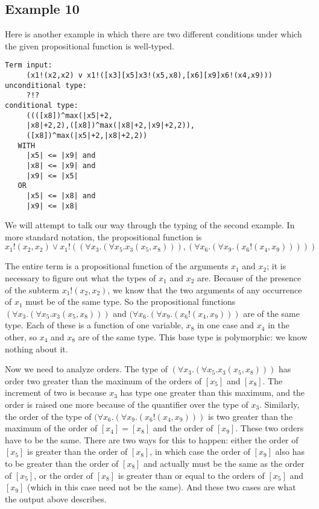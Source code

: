 \documentclass{article}
\begin{document}
\subsection{Example 10}
Here is another example in which there are two different conditions under which
the given propositional function is well-typed.


\begin{verbatim}
Term input:
     (x1!(x2,x2) v x1!([x3][x5]x3!(x5,x8),[x6][x9]x6!(x4,x9)))
unconditional type:
     ?!? 
conditional type:
     ((([x8])^max(|x5|+2,
     |x8|+2,2),([x8])^max(|x8|+2,|x9|+2,2)),
     ([x8])^max(|x5|+2,|x8|+2,2))
   WITH
     |x5| <= |x9| and
     |x8| <= |x9| and
     |x9| <= |x5|
   OR
     |x5| <= |x8| and
     |x9| <= |x8|
\end{verbatim}

We will attempt to talk our way through the typing of the second example.
In more standard notation, the propositional function is
$$x_1!(x_2,x_2) \vee x_1!((\forall x_3.(\forall x_5.x_3(x_5,x_8))),(\forall x_6.(\forall x_9.(x_6!(x_4,x_9)))))$$

The entire term is a propositional function of the arguments $x_1$ and
$x_2$; it is necessary to figure out what the types of $x_1$ and $x_2$ are.
Because of the presence of the subterm $x_1!(x_2,x_2)$, we know that
the two arguments of any occurrence of $x_1$ must be of the same type.
So the propositional functions $(\forall x_3.(\forall
x_5.x_3(x_5,x_8)))$ and $(\forall x_6.(\forall x_9.(x_6!(x_4,x_9)))$
are of the same type.  Each of these is a function of one variable,
$x_8$ in one case and $x_4$ in the other, so $x_4$ and $x_8$ are of
the same type.  This base type is polymorphic: we know nothing about
it.

Now we need to analyze orders.  The type of $(\forall
x_3.(\forall x_5.x_3(x_5,x_8)))$ has order two greater than the maximum of
the orders of $[x_5]$ and $[x_8]$.  The increment of two is because
$x_3$ has type one greater than this maximum, and the order is raised
one more because of the quantifier over the type of $x_3$.  Similarly,
the order of the type of $(\forall x_6.(\forall x_9.(x_6!(x_4,x_9)))$
is two greater than the maximum of the order of $[x_4] = [x_8]$ and
the order of $[x_9]$.  These two orders have to be the same.  There
are two ways for this to happen: either the order of $[x_5]$ is
greater than the order of $[x_8]$, in which case the order of $[x_9]$
also has to be greater than the order of $[x_8]$ and actually must be
the same as the order of $[x_5]$, or the order of $[x_8]$ is greater
than or equal to the orders of $[x_5]$ and $[x_9]$ (which in this case
need not be the same).  And these two cases are what the output above
describes.
\end{document}
